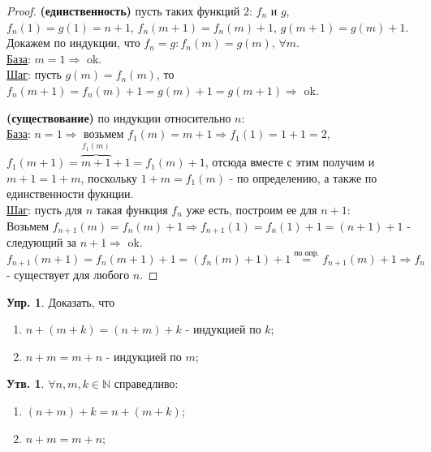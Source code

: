 \documentclass[12pt]{article}
\theoremstyle{definition}
\newtheorem{prop}{Утв.}
\newtheorem{exrc}{Упр.}
\begin{document}
\begin{proof}
	\textbf{(единственность)} пусть таких функций 2: $f_n$ и $g$, $f_n(1) = g(1) = n+1$, $f_n(m+1) = f_n(m) + 1$, $g(m+1) = g(m) + 1$. Докажем по индукции, что $f_n = g \colon f_n(m) = g(m),\, \forall m$.\\
	\uline{База}: $m=1 \Rightarrow $ ok.\\
	\uline{Шаг}: пусть $g(m) = f_n(m)$, то $f_n(m+1) = f_n(m) + 1 = g(m) + 1 = g(m+1) \Rightarrow $ ok.
	
	\textbf{(существование)} по индукции относительно $n$:\\
	\uline{База}: $n=1 \Rightarrow$ возьмем $f_1(m) = m+1 \Rightarrow f_1(1) = 1 + 1 = 2$, $f_1(m+1) = \overbrace{m + 1}^{f_1(m)} + 1 = f_1(m) + 1$, отсюда вместе с этим получим и $m+1 = 1+ m$, поскольку $1 + m = f_1(m)$ - по определению, а также по единственности фукнции.\\
	\uline{Шаг}: пусть для $n$ такая функция $f_n$ уже есть, построим ее для $n+1$:\\
	Возьмем $f_{n+1}(m) = f_n(m) + 1 \Rightarrow f_{n+1}(1) = f_n(1) + 1 = (n+1) + 1$ - следующий за $n+1 \Rightarrow$ ok.\\
	$f_{n+1}(m+1) = f_n(m+1) + 1 = (f_n(m) + 1) + 1 \overset{\text{по опр.}}{=} f_{n+1}(m) + 1 \Rightarrow f_n$ - существует для любого $n$.
\end{proof}


\begin{exrc}
	Доказать, что 
	\begin{enumerate}[label={(\arabic*)}]
		\item $n + (m+ k) = (n+m) + k$ - индукцией по $k$;
		\item $n + m = m+ n$ - индукцией по $m$;
	\end{enumerate}
\end{exrc}

\begin{prop}
	$\forall n, m, k \in \mathbb{N}$ справедливо: 
	\begin{enumerate}[label={(\arabic*)}]
		\item $(n + m) + k = n + (m+k)$;
		\item $n + m = m + n$;
	\end{enumerate}
\end{prop}
\end{document}
